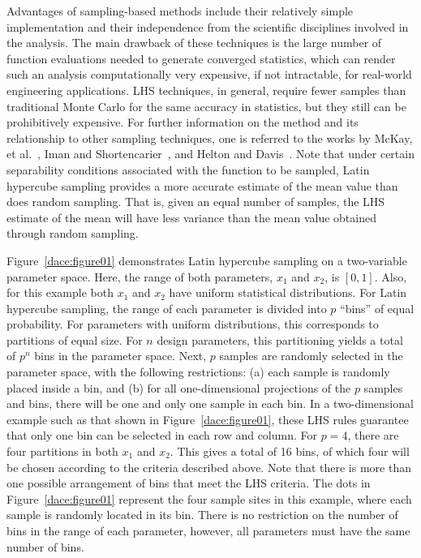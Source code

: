 Advantages of sampling-based methods include their relatively simple
implementation and their independence from the scientific disciplines
involved in the analysis. The main drawback of these techniques is the
large number of function evaluations needed to generate converged
statistics, which can render such an analysis computationally very
expensive, if not intractable, for real-world engineering
applications. LHS techniques, in general, require fewer samples than
traditional Monte Carlo for the same accuracy in statistics, but they
still can be prohibitively expensive. For further information on the
method and its relationship to other sampling techniques, one is
referred to the works by McKay, et al.~\cite{Mck79}, Iman and
Shortencarier~\cite{Ima84}, and Helton and Davis~\cite{Hel00}.
Note that under certain separability conditions associated with the 
function to be sampled,
Latin hypercube sampling provides a more accurate estimate of the mean
value than does random sampling. That is, given an equal number of
samples, the LHS estimate of the mean will have less variance than the
mean value obtained through random sampling.

Figure~\ref{dace:figure01} demonstrates Latin hypercube sampling on a
two-variable parameter space. Here, the range of both parameters,
$x_1$ and $x_2$, is $[0,1]$. Also, for this example both $x_1$
and $x_2$ have uniform statistical distributions. For Latin
hypercube sampling, the range of each parameter is divided into $p$
``bins'' of equal probability. For parameters with uniform
distributions, this corresponds to partitions of equal size. For $n$
design parameters, this partitioning yields a total of $p^{n}$ bins in
the parameter space. Next, $p$ samples are randomly selected in the
parameter space, with the following restrictions: (a) each sample is
randomly placed inside a bin, and (b) for all one-dimensional
projections of the $p$ samples and bins, there will be one and only
one sample in each bin. In a two-dimensional example such as that
shown in Figure~\ref{dace:figure01}, these LHS rules guarantee that
only one bin can be selected in each row and column. For $p=4$, there
are four partitions in both $x_1$ and $x_2$. This gives a total of
16 bins, of which four will be chosen according to the criteria
described above. Note that there is more than one possible arrangement
of bins that meet the LHS criteria. The dots in
Figure~\ref{dace:figure01} represent the four sample sites in this
example, where each sample is randomly located in its bin. There is
no restriction on the number of bins in the range of each parameter,
however, all parameters must have the same number of bins.

